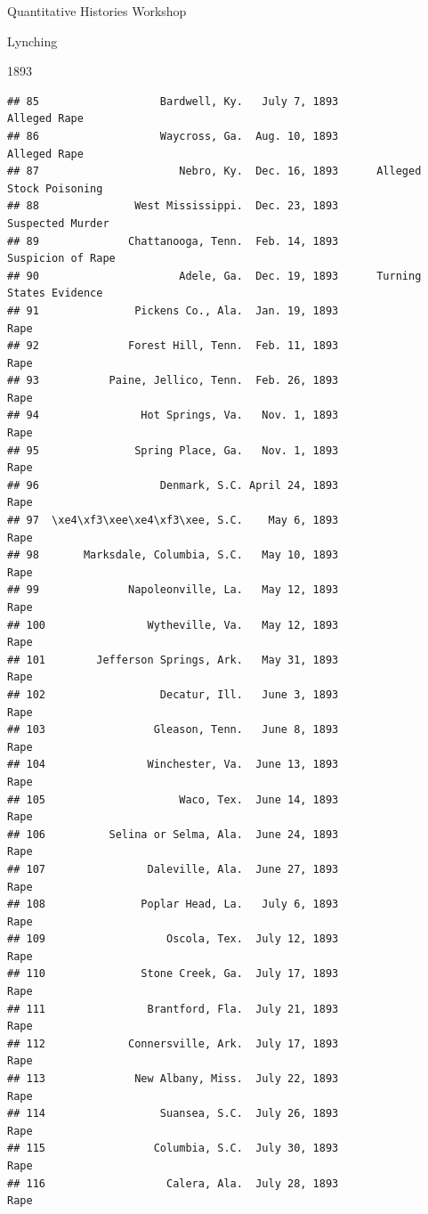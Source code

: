 \documentclass[
  ignorenonframetext,
]{beamer}
\begin{document}
\begin{frame}[fragile]{Quantitative Histories Workshop}
\begin{block}{Lynching}
\begin{block}{1893}
\begin{verbatim}
## 85                   Bardwell, Ky.   July 7, 1893                 Alleged Rape
## 86                   Waycross, Ga.  Aug. 10, 1893                 Alleged Rape
## 87                      Nebro, Ky.  Dec. 16, 1893      Alleged Stock Poisoning
## 88               West Mississippi.  Dec. 23, 1893             Suspected Murder
## 89              Chattanooga, Tenn.  Feb. 14, 1893            Suspicion of Rape
## 90                      Adele, Ga.  Dec. 19, 1893      Turning States Evidence
## 91               Pickens Co., Ala.  Jan. 19, 1893                         Rape
## 92              Forest Hill, Tenn.  Feb. 11, 1893                         Rape
## 93           Paine, Jellico, Tenn.  Feb. 26, 1893                         Rape
## 94                Hot Springs, Va.   Nov. 1, 1893                         Rape
## 95               Spring Place, Ga.   Nov. 1, 1893                         Rape
## 96                   Denmark, S.C. April 24, 1893                         Rape
## 97  \xe4\xf3\xee\xe4\xf3\xee, S.C.    May 6, 1893                         Rape
## 98       Marksdale, Columbia, S.C.   May 10, 1893                         Rape
## 99              Napoleonville, La.   May 12, 1893                         Rape
## 100                Wytheville, Va.   May 12, 1893                         Rape
## 101        Jefferson Springs, Ark.   May 31, 1893                         Rape
## 102                  Decatur, Ill.   June 3, 1893                         Rape
## 103                 Gleason, Tenn.   June 8, 1893                         Rape
## 104                Winchester, Va.  June 13, 1893                         Rape
## 105                     Waco, Tex.  June 14, 1893                         Rape
## 106          Selina or Selma, Ala.  June 24, 1893                         Rape
## 107                Daleville, Ala.  June 27, 1893                         Rape
## 108               Poplar Head, La.   July 6, 1893                         Rape
## 109                   Oscola, Tex.  July 12, 1893                         Rape
## 110               Stone Creek, Ga.  July 17, 1893                         Rape
## 111                Brantford, Fla.  July 21, 1893                         Rape
## 112             Connersville, Ark.  July 17, 1893                         Rape
## 113              New Albany, Miss.  July 22, 1893                         Rape
## 114                  Suansea, S.C.  July 26, 1893                         Rape
## 115                 Columbia, S.C.  July 30, 1893                         Rape
## 116                   Calera, Ala.  July 28, 1893                         Rape

\end{verbatim}
\end{block}
\end{block}
\end{frame}
\end{document}
